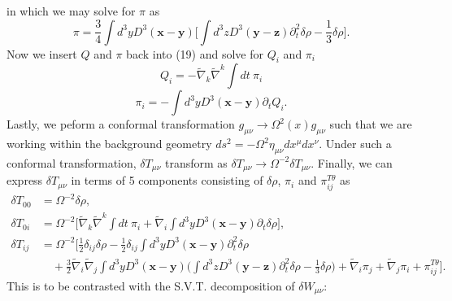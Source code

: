 \documentclass[10pt,letterpaper]{article}
\begin{document}
in which we may solve for $\pi$ as
\begin{equation}
\pi = \frac34 \int d^3y D^3(\mathbf x-\mathbf y) \bigg[ \int d^3z D^3(\mathbf y-\mathbf z) \partial_t^2 \delta \rho - \frac13\delta\rho\bigg].
\end{equation}
Now we insert $Q$ and $\pi$ back into (19) and solve for $Q_i$ and $\pi_i$
\begin{equation}
Q_i = - \tilde\nabla_k \tilde\nabla^k \int dt\  \pi_i 
\end{equation}
\begin{equation}
\pi_i = - \int d^3y D^3(\mathbf x-\mathbf y) \partial_t Q_i.
\end{equation}
Lastly, we peform a conformal transformation $g_{\mu\nu} \to \Omega^2(x) g_{\mu\nu}$ such that we are working within the background geometry $ds^2 = - \Omega^2 \eta_{\mu\nu} dx^\mu dx^\nu$. Under such a conformal transformation, $\delta T_{\mu\nu}$ transform as $\delta T_{\mu\nu} \to \Omega^{-2} \delta T_{\mu\nu}$. 
Finally, we can express $\delta T_{\mu\nu}$ in terms of 5 components consisting of $\delta \rho$, $\pi_i$ and $\pi_{ij}^{T\theta}$ as
\begin{align}
\delta T_{00}  &= \Omega^{-2} \delta \rho,
\nonumber\\	
\delta T_{0i} &= \Omega^{-2} \bigg[ \tilde\nabla_k \tilde\nabla^k \int dt\  \pi_i  + \tilde\nabla_i  \int d^3y D^3(\mathbf x-\mathbf y) \partial_t \delta \rho\bigg],
\nonumber\\	
\delta T_{ij}  &= \Omega^{-2}\bigg[ 
\frac12 \delta_{ij} \delta\rho - \frac12 \delta_{ij} \int d^3y D^3(\mathbf x-\mathbf y) \partial_t^2 \delta \rho \nonumber\\
&\quad +\frac32 \tilde\nabla_i\tilde\nabla_j \int d^3y D^3(\mathbf x-\mathbf y) \bigg( \int d^3z D^3(\mathbf y-\mathbf z) \partial_t^2 \delta \rho - \frac13\delta\rho\bigg)
+ \tilde\nabla_i \pi_j + \tilde\nabla_j \pi_i + \pi_{ij}^{T\theta}\bigg].
\end{align}
This is to be contrasted with the S.V.T. decomposition of $\delta W_{\mu\nu}$:
\end{document}
